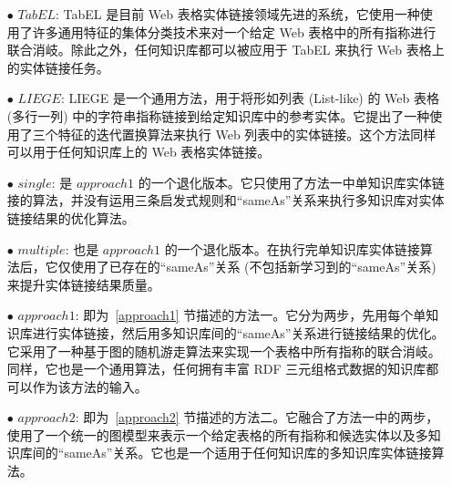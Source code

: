 \begin{itemize}
  \item[$\bullet$] $TabEL$: TabEL\cite{bhagavatula2015tabel} 是目前 Web 表格实体链接领域先进的系统，它使用一种使用了许多通用特征的集体分类技术来对一个给定 Web 表格中的所有指称进行联合消岐。除此之外，任何知识库都可以被应用于 TabEL 来执行 Web 表格上的实体链接任务。
  \item[$\bullet$] $LIEGE$: LIEGE\cite{shen2012liege} 是一个通用方法，用于将形如列表 (List-like) 的 Web 表格 (多行一列) 中的字符串指称链接到给定知识库中的参考实体。它提出了一种使用了三个特征的迭代置换算法来执行 Web 列表中的实体链接。这个方法同样可以用于任何知识库上的 Web 表格实体链接。
  \item[$\bullet$] $single$: 是 $approach1$ 的一个退化版本。它只使用了方法一中单知识库实体链接的算法，并没有运用三条启发式规则和``sameAs''关系来执行多知识库对实体链接结果的优化算法。
  \item[$\bullet$] $multiple$: 也是 $approach1$ 的一个退化版本。在执行完单知识库实体链接算法后，它仅使用了已存在的``sameAs''关系 (不包括新学习到的``sameAs''关系) 来提升实体链接结果质量。
  \item[$\bullet$] $approach1$: 即为~\ref{approach1} 节描述的方法一。它分为两步，先用每个单知识库进行实体链接，然后用多知识库间的``sameAs''关系进行链接结果的优化。它采用了一种基于图的随机游走算法来实现一个表格中所有指称的联合消岐。同样，它也是一个通用算法，任何拥有丰富 RDF 三元组格式数据的知识库都可以作为该方法的输入。
  \item[$\bullet$] $approach2$: 即为~\ref{approach2} 节描述的方法二。它融合了方法一中的两步，使用了一个统一的图模型来表示一个给定表格的所有指称和候选实体以及多知识库间的``sameAs''关系。它也是一个适用于任何知识库的多知识库实体链接算法。
\end{itemize}

